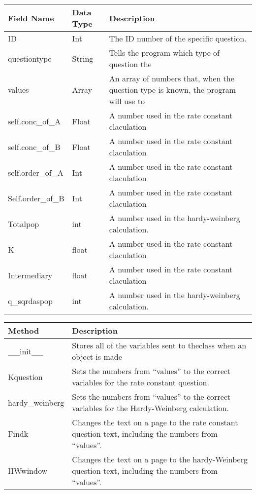 \documentclass[letterpaper]{article}
\title{}
\author{}
\date{2015-04-01}
\begin{document}
\bigskip

\begin{center}
\tablefirsthead{}
\tablehead{}
\tabletail{}
\tablelasttail{}
\begin{supertabular}{|m{1.6525599in}|m{1.6525599in}|m{3.38376in}|}
\hline
Field Name &
Data Type &
Description\\\hline
ID &
Int &
The ID number of the specific question.\\\hline
questiontype &
String &
Tells the program which type of question the \\\hline
values &
Array &
An array of numbers that, when the question type is known, the program will use to \\\hline
self.conc\_of\_A &
Float &
A number used in the rate constant claculation\\\hline
self.conc\_of\_B &
Float &
A number used in the rate constant claculation\\\hline
self.order\_of\_A &
Int &
A number used in the rate constant claculation\\\hline
Self.order\_of\_B &
Int  &
A number used in the rate constant claculation\\\hline
Totalpop &
int &
A number used in the hardy-weinberg calculation.\\\hline
K &
float &
A number used in the rate constant claculation\\\hline
Intermediary &
float &
A number used in the rate constant claculation\\\hline
q\_sqrdaspop &
int &
A number used in the hardy-weinberg calculation.\\\hline
\end{supertabular}
\end{center}

\bigskip


\bigskip

\begin{center}
\tablefirsthead{}
\tablehead{}
\tabletail{}
\tablelasttail{}
\begin{supertabular}{|m{2.72956in}|m{2.72956in}|}
\hline
Method &
Description\\\hline
\_\_init\_\_ &
Stores  all  of  the  variables  sent  to  theclass when an object is made
\\\hline
Kquestion &
Sets the numbers from ``values'' to the correct variables for the rate constant question.\\\hline
hardy\_weinberg &
Sets the numbers from ``values'' to the correct variables for the Hardy-Weinberg calculation.\\\hline
Findk &
Changes the text on a page to the rate constant question text, including the numbers from ``values''.\\\hline
HWwindow &
Changes the text on a page to the hardy-Weinberg question text, including the numbers from ``values''.\\\hline
\end{supertabular}
\end{center}

\bigskip
\end{document}
